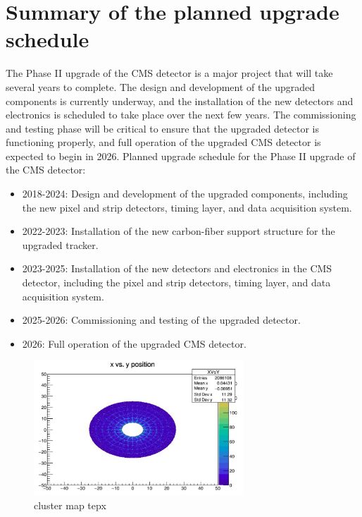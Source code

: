 \section{Summary of the planned upgrade schedule}

The Phase II upgrade of the CMS detector is a major project that will take several years to complete. The design and development of the upgraded components is currently underway, and the installation of the new detectors and electronics is scheduled to take place over the next few years. The commissioning and testing phase will be critical to ensure that the upgraded detector is functioning properly, and full operation of the upgraded CMS detector is expected to begin in 2026. Planned upgrade schedule for the Phase II upgrade of the CMS detector:

\begin{itemize}

\item 2018-2024: Design and development of the upgraded components, including the new pixel and strip detectors, timing layer, and data acquisition system.

\item 2022-2023: Installation of the new carbon-fiber support structure for the upgraded tracker.

\item 2023-2025: Installation of the new detectors and electronics in the CMS detector, including the pixel and strip detectors, timing layer, and data acquisition system.

\item 2025-2026: Commissioning and testing of the upgraded detector.

\item 2026: Full operation of the upgraded CMS detector.

\end{itemize}







\begin{figure}[!htp]
\centering
\includegraphics[width=0.7\textwidth]{ashish_thesis/xvsy_cluster.png}
\caption{%
  cluster map tepx 
}
\label{fig:cluster_xvsy}
\end{figure}


